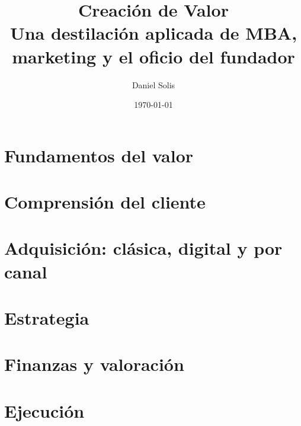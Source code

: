 \documentclass[11pt,a4paper,oneside]{scrbook}
\title{\textbf{Creación de Valor}\\[0.4em]\large Una destilación aplicada de MBA, marketing y el oficio del fundador}
\author{Daniel Solis}
\date{\today}
\begin{document}
\frontmatter
\maketitle
\tableofcontents

\mainmatter

\part{Fundamentos del valor}





\part{Comprensión del cliente}






\part{Adquisición: clásica, digital y por canal}





\part{Estrategia}





\part{Finanzas y valoración}







\part{Ejecución}



\end{document}
